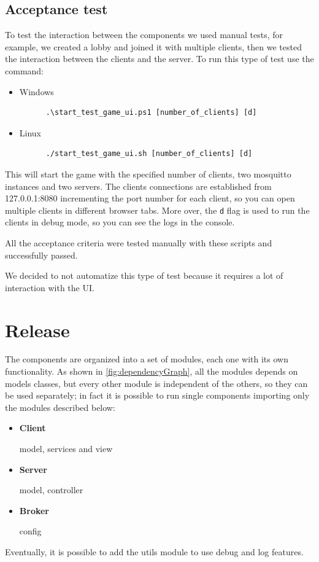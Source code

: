 \documentclass{scrartcl}
\begin{document}
\subsection{Acceptance test}\label{acceptance-test}
To test the interaction between the components we used manual tests, for example, we created a 
lobby and joined it with multiple clients, then we tested the interaction between the clients and 
the server.
To run this type of test use the command:
\begin{itemize}
      \item Windows
            \begin{verbatim}
      .\start_test_game_ui.ps1 [number_of_clients] [d]
            \end{verbatim}
      \item Linux
            \begin{verbatim}
      ./start_test_game_ui.sh [number_of_clients] [d]
            \end{verbatim}
\end{itemize}
This will start the game with the specified number of clients, two mosquitto instances and two servers.
The clients connections are established from 127.0.0.1:8080 incrementing the port number for each 
client, so you can  open multiple clients in different browser tabs. More over, the \texttt{d} flag
is used to run the clients in debug mode, so you can see the logs in the console.

All the acceptance criteria were tested manually with these scripts and successfully passed.

We decided to not automatize this type of test because it requires a lot of interaction with the UI.

\newpage
\section{Release}\label{release}
The components are organized into a set of modules, each one with its own functionality.
As shown in \cref{fig:dependencyGraph}, all the modules depends on models classes, but every other 
module is independent of the others, so they can be used separately; in fact it is possible to run 
single components importing only the modules described below:
\begin{itemize}
      \item \textbf{Client}\par
            model, services and view
      \item \textbf{Server}\par
            model, controller
      \item \textbf{Broker}\par
            config
\end{itemize}
Eventually, it is possible to add the utils module to use debug and log features.
\end{document}

